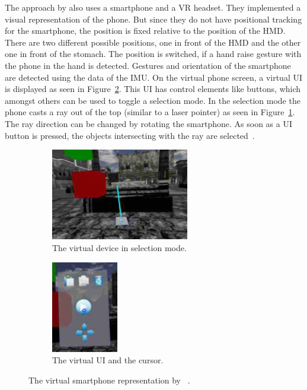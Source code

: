 The approach by \citeauthor{Steed.2013} also uses a smartphone and a \ac{VR} headset. They implemented a visual representation of the phone. But since they do not have positional tracking for the smartphone, the position is fixed relative to the position of the \ac{HMD}. There are two different possible positions, one in front of the \ac{HMD} and the other one in front of the stomach. The position is switched, if a hand raise gesture with the phone in the hand is detected. Gestures and orientation of the smartphone are detected using the data of the \ac{IMU}. On the virtual phone screen, a virtual \ac{UI} is displayed as seen in Figure~\ref{fig:steed-2013-ui}. This \ac{UI} has control elements like buttons, which amongst others can be used to toggle a selection mode. In the selection mode the phone casts a ray out of the top (similar to a laser pointer) as seen in Figure~\ref{fig:steed-2013-laser-pointer}. The ray direction can be changed by rotating the smartphone. As soon as a \ac{UI} button is pressed, the objects intersecting with the ray are selected~\cite{Steed.2013}.

\begin{figure}[H]
  \centering
  \begin{subfigure}{0.45\textwidth}%
    \centering%
    \includegraphics[height=4cm]{figures/steed_2013_laser_pointer.png}
    \caption{The virtual device in selection mode.}\label{fig:steed-2013-laser-pointer}%
  \end{subfigure}%
  \hspace{0.1\textwidth}%
  \begin{subfigure}{0.45\textwidth}%
    \centering%
    \includegraphics[height=4cm]{figures/steed_2013_ui.png}
    \caption{The virtual \ac{UI} and the cursor.}\label{fig:steed-2013-ui}
  \end{subfigure}%
  \caption[Virtual smartphone representation by Steep et al.]{The virtual smartphone representation by \citeauthor{Steed.2013}~\protect\cite[43]{Steed.2013}.}\label{fig:steed-2013}
\end{figure}